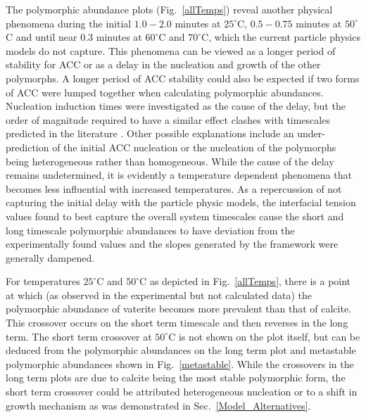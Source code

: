 \documentclass[preprint,3p,a4paper,times,12pt,authoryear]{elsarticle}
\begin{document}
The polymorphic abundance plots (Fig.~\ref{allTemps}) reveal another physical phenomena during the initial $1.0-2.0$ minutes at $25^\circ$C, $0.5-0.75$ minutes at $50^\circ$C and until near 0.3 minutes at $60^\circ$C and $70^\circ$C, which the current particle physics models do not capture.  This phenomena can be viewed as a longer period of stability for ACC or as a delay in the nucleation and growth of the other polymorphs.  A longer period of ACC stability could also be expected if two forms of ACC were lumped together when calculating polymorphic abundances.  Nucleation induction times were investigated as the cause of the delay, but the order of magnitude required to have a similar effect clashes with timescales predicted in the literature \citep{Kashchiev1969}.  Other possible explanations include an under-prediction of the initial ACC nucleation or the nucleation of the polymorphs being heterogeneous rather than homogeneous.  While the cause of the delay remains undetermined, it is evidently a temperature dependent phenomena that becomes less influential with increased temperatures.  As a repercussion of not capturing the initial delay with the particle physic models, the interfacial tension values found to best capture the overall system timescales cause the short and long timescale polymorphic abundances to have deviation from the experimentally found values and the slopes generated by the framework were generally dampened.  

For temperatures $25^\circ$C and $50^\circ$C as depicted in Fig.~\ref{allTemps}, there is a point at which (as observed in the experimental but not calculated data) the polymorphic abundance of vaterite becomes more prevalent than that of calcite.  This crossover occurs on the short term timescale and then reverses in the long term.  The short term crossover at $50^\circ$C is not shown on the plot itself, but can be deduced from the polymorphic abundances on the long term plot and metastable polymorphic abundances shown in Fig.~\ref{metastable}.  While the crossovers in the long term plots are due to calcite being the most stable polymorphic form, the short term crossover could be attributed heterogeneous nucleation or to a shift in growth mechanism as was demonstrated in Sec.~\ref{Model_Alternatives}.
\end{document}
